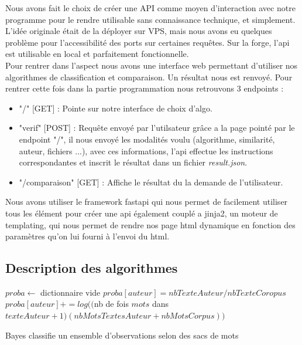 \documentclass[french,12pt]{article}
\begin{document}
Nous avons fait le choix de créer une API comme moyen d'interaction avec notre programme pour le rendre utilisable sans connaissance technique, et simplement. L'idée originale était de la déployer sur VPS, mais nous avons eu quelques problème pour l'accessibilité des ports sur certaines requêtes. Sur la forge, l'api est utilisable en local et parfaitement fonctionnelle.\\

Pour rentrer dans l'aspect nous avons une interface web permettant d'utiliser nos algorithmes de classification et comparaison. Un résultat nous est renvoyé. Pour rentrer cette fois dans la partie programmation nous retrouvons 3 endpoints : \\
\begin{itemize}
    \item "/" [GET] : Pointe sur notre interface de choix d'algo.\\
    \item "verif" [POST] : Requête envoyé par l'utilsateur grâce a la page pointé par le endpoint "/", il nous envoyé les modalités voulu (algorithme, similarité, auteur, fichiers ...), avec ces informations, l'api effectue les instructions correspondantes et inscrit le résultat dans un fichier \textit{result.json}.\\
    \item "/comparaison" [GET] : Affiche le résultat du la demande de l'utilisateur.\\
\end{itemize}

Nous avons utiliser le framework fastapi qui nous permet de facilement utiliser tous les élément pour créer une api également couplé a jinja2, un moteur de templating, qui nous permet de rendre nos page html dynamique en fonction des paramètres qu'on lui fourni à l'envoi du html.

\subsection{Description des algorithmes}

\begin{algorithm}[H]
\DontPrintSemicolon
{}
$proba \gets $ dictionnaire vide\;
 {
  $proba[auteur] = nbTexteAuteur / nbTexteCoropus$\;
   {
     {
      $proba[auteur] += log(($nb de fois $mots$ dans $texteAuteur+1)
      (nbMotsTextesAuteur + nbMotsCorpus))$\;
   	}
  }
}
 {
}
\caption{{\sc Bayes} classifie un ensemble d'observations selon des sacs de mots}
\end{algorithm}
\end{document}
